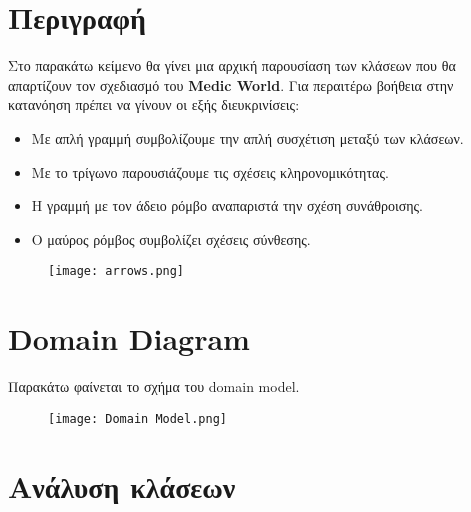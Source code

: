\documentclass{article}
\begin{document}
\section{Περιγραφή}
Στο παρακάτω κείμενο θα γίνει μια αρχική παρουσίαση των κλάσεων που θα απαρτίζουν τον σχεδιασμό του \textbf{Medic World}. Για περαιτέρω βοήθεια στην κατανόηση πρέπει να γίνουν οι εξής διευκρινίσεις:
\begin{itemize}
    \item Με απλή γραμμή συμβολίζουμε την απλή συσχέτιση μεταξύ των κλάσεων.
    \item Με το τρίγωνο παρουσιάζουμε τις σχέσεις κληρονομικότητας.
    \item Η γραμμή με τον άδειο ρόμβο αναπαριστά την σχέση συνάθροισης.
    \item Ο μαύρος ρόμβος συμβολίζει σχέσεις σύνθεσης.
\end{itemize}

\begin{figure}[!htb]
        \centering
        \texttt{[image: arrows.png]}
\end{figure}
\newpage
\section{Domain Diagram}
Παρακάτω φαίνεται το  σχήμα του domain model.


\begin{figure}[!htb]
        \centering
        \texttt{[image: Domain Model.png]}
\end{figure}
        



\section{Ανάλυση κλάσεων}
\end{document}
